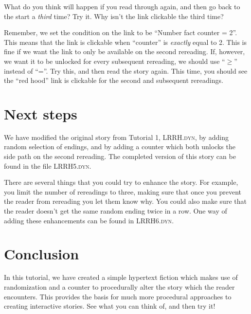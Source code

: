 \documentclass{article}
\begin{document}
What do you think will happen if you read through again, and then go 
back to the start a \textit{third} time? Try it. Why isn't the link 
clickable the third time?

Remember, we set the condition on the link to be ``Number fact 
counter = 2''. This means that the link is clickable when ``counter'' 
is \textit{exactly} equal to 2. This is fine if we want the link to 
only be available on the second rereading. If, however, we want it to 
be unlocked for every subsequent rereading, we should use ``$\ge$'' 
instead of ``=''. Try this, and then read the story again. This time, 
you should see the ``red hood'' link is clickable for the second and 
subsequent rereadings.



\section{Next steps}

We have modified the original story from Tutorial 1, 
\textsc{LRRH.dyn}, by adding random selection of endings, and by 
adding a counter which both unlocks the side path on the second 
rereading. The completed version of this story can be found in the 
file \textsc{LRRH5.dyn}. 

There are several things that you could try to enhance the story. For example,
you limit the number of rereadings to three, making sure that once 
you prevent the reader from rereading you let them know why. You 
could also make sure that the reader doesn't get the same random 
ending twice in a row. One way of adding these enhancements can be 
found in \textsc{LRRH6.dyn}. 

\section{Conclusion}

In this tutorial, we have created a simple hypertext fiction which 
makes use of randomization and a counter to procedurally alter the 
story which the reader encounters. This provides the basis for much 
more procedural approaches to creating interactive stories. See what 
you can think of, and then try it!
\end{document}
